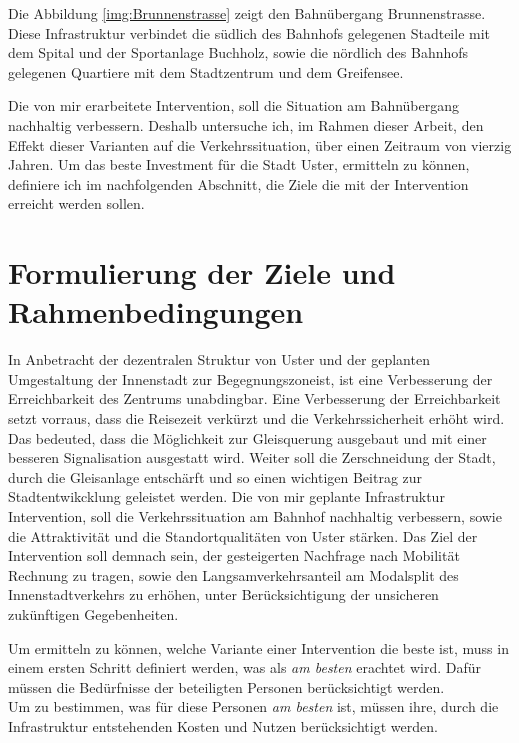 Die Abbildung \ref{img:Brunnenstrasse} zeigt den Bahnübergang Brunnenstrasse. Diese Infrastruktur verbindet die südlich des Bahnhofs gelegenen Stadteile mit dem Spital und der Sportanlage Buchholz, sowie die nördlich des Bahnhofs gelegenen Quartiere mit dem Stadtzentrum und dem Greifensee. 

Die von mir erarbeitete Intervention, soll die Situation am Bahnübergang nachhaltig verbessern. Deshalb untersuche ich, im Rahmen dieser Arbeit, den Effekt dieser Varianten auf die Verkehrssituation, über einen Zeitraum von vierzig Jahren. Um das beste Investment für die Stadt Uster, ermitteln zu können, definiere ich im nachfolgenden Abschnitt, die Ziele die mit der Intervention erreicht werden sollen.

\pagebreak

\section{Formulierung der Ziele und Rahmenbedingungen}
\label{sec:Zielformulierung}

In Anbetracht der dezentralen Struktur von Uster und der geplanten Umgestaltung der Innenstadt zur Begegnungszoneist, ist eine Verbesserung der Erreichbarkeit des Zentrums unabdingbar. Eine Verbesserung der Erreichbarkeit setzt vorraus, dass die Reisezeit verkürzt und die Verkehrssicherheit erhöht wird. Das bedeuted, dass die Möglichkeit zur Gleisquerung ausgebaut und mit einer besseren Signalisation ausgestatt wird. Weiter soll die Zerschneidung der Stadt, durch die Gleisanlage entschärft und so einen wichtigen Beitrag zur Stadtentwikcklung geleistet werden. Die von mir geplante Infrastruktur Intervention, soll die Verkehrssituation am Bahnhof nachhaltig verbessern, sowie die Attraktivität und die Standortqualitäten von Uster stärken.
Das Ziel der Intervention soll demnach sein, der gesteigerten Nachfrage nach Mobilität Rechnung zu tragen, sowie den Langsamverkehrsanteil am Modalsplit des Innenstadtverkehrs zu erhöhen, unter Berücksichtigung der unsicheren zukünftigen Gegebenheiten.

Um ermitteln zu können, welche Variante einer Intervention die beste ist, muss in einem ersten Schritt definiert werden, was als \textit{am besten} erachtet wird. Dafür müssen die Bedürfnisse der beteiligten Personen berücksichtigt werden. \\
Um zu bestimmen, was für diese Personen \textit{am besten} ist, müssen ihre, durch die Infrastruktur entstehenden Kosten und Nutzen berücksichtigt werden.
 
